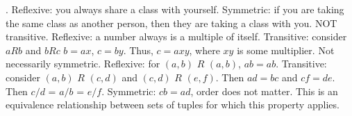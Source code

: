 \documentclass[solution, letterpaper]{cs20inclass}
\begin{document}
\begin{solution}
\subsolution. Reflexive: you always share a class with yourself. Symmetric: if you are taking the same class as another person, then they are taking a class with you. NOT transitive. 
\subsolution Reflexive: a number always is a multiple of itself.  Transitive: consider $aRb$ and  $bRc$ $b = ax$, $c = by$. Thus, $c = axy$, where $xy$ is some multiplier. Not necessarily symmetric. 
\subsolution Reflexive: for $(a,b)$ $R$ $(a,b)$, $ab = ab$. Transitive: consider $(a,b)$ $R$ $(c,d)$ and  $(c,d)$ $R$ $(e,f)$. Then $ad = bc$ and $cf = de$. Then $c/d$ = $a/b$ = $e/f$. Symmetric: $cb = ad$, order does not matter. This is an equivalence relationship between sets of tuples for which this property applies. 

\end{solution}
\end{document}
